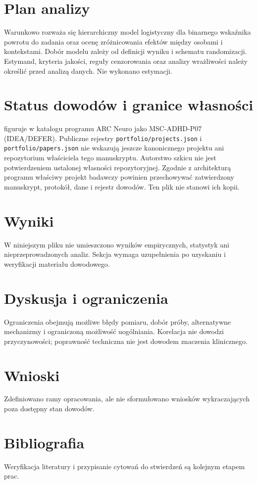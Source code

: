 \documentclass[11pt,a4paper]{article}
\begin{document}
\section{Plan analizy}

Warunkowo rozważa się hierarchiczny model logistyczny dla binarnego wskaźnika powrotu do zadania oraz ocenę zróżnicowania efektów między osobami i kontekstami. Dobór modelu zależy od definicji wyniku i schematu randomizacji. Estymand, kryteria jakości, reguły cenzorowania oraz analizy wrażliwości należy określić przed analizą danych. Nie wykonano estymacji.

\section{Status dowodów i granice własności}\n\nKoncepcja figuruje w katalogu programu ARC Neuro jako MSC-ADHD-P07 (IDEA/DEFER). Publiczne rejestry \texttt{portfolio/projects.json} i \texttt{portfolio/papers.json} nie wskazują jeszcze kanonicznego projektu ani repozytorium właściciela tego manuskryptu. Autorstwo szkicu nie jest potwierdzeniem ustalonej własności repozytoryjnej. Zgodnie z architekturą programu właściwy projekt badawczy powinien przechowywać zatwierdzony manuskrypt, protokół, dane i rejestr dowodów. Ten plik nie stanowi ich kopii.\n\n\section{Wyniki}

W niniejszym pliku nie umieszczono wyników empirycznych, statystyk ani nieprzeprowadzonych analiz. Sekcja wymaga uzupełnienia po uzyskaniu i weryfikacji materiału dowodowego.

\section{Dyskusja i ograniczenia}

Ograniczenia obejmują możliwe błędy pomiaru, dobór próby, alternatywne mechanizmy i ograniczoną możliwość uogólniania. Korelacja nie dowodzi przyczynowości; poprawność techniczna nie jest dowodem znaczenia klinicznego.

\section{Wnioski}

Zdefiniowano ramy opracowania, ale nie sformułowano wniosków wykraczających poza dostępny stan dowodów.

\section*{Bibliografia}

Weryfikacja literatury i przypisanie cytowań do stwierdzeń są kolejnym etapem prac.
\end{document}
